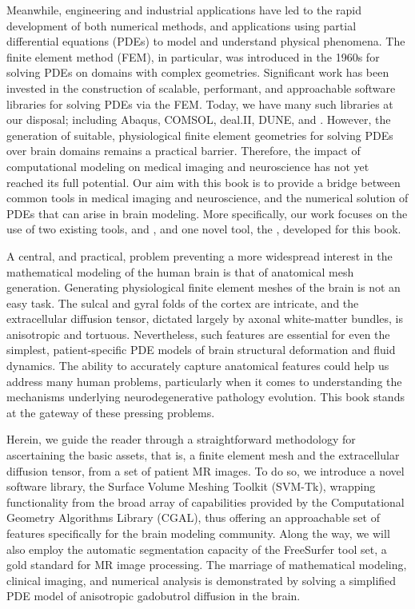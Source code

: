 Meanwhile, engineering and industrial applications have led to the
rapid development of both numerical methods, and applications using
partial differential equations (PDEs) to model and understand physical
phenomena. The finite element method (FEM), in particular, was
introduced in the 1960s for solving PDEs on domains with complex
geometries. Significant work has been invested in the construction of
scalable, performant, and approachable software libraries for solving
PDEs via the FEM. Today, we have many such libraries at our disposal;
including Abaqus, COMSOL, deal.II, DUNE, and {\fenics}. However, the
generation of suitable, physiological finite element geometries for
solving PDEs over brain domains remains a practical
barrier. Therefore, the impact of computational modeling on medical
imaging and neuroscience has not yet reached its full potential. Our
aim with this book is to provide a bridge between common tools in
medical imaging and neuroscience, and the numerical solution of PDEs
that can arise in brain modeling. More specifically, our work focuses
on the use of two existing tools, {\freesurfer} and {\fenics}, and one
novel tool, the {\svmtk}, developed for this book.
 
A central, and practical, problem preventing a more widespread
interest in the mathematical modeling of the human brain is that of
anatomical mesh generation.  Generating physiological finite element
meshes of the brain is not an easy task. The sulcal and gyral folds of
the cortex are intricate, and the extracellular diffusion tensor,
dictated largely by axonal white-matter bundles, is anisotropic and
tortuous. Nevertheless, such features are essential for even the
simplest, patient-specific PDE models of brain structural deformation
and fluid dynamics. The ability to accurately capture anatomical
features could help us address many human problems, particularly when
it comes to understanding the mechanisms underlying neurodegenerative
pathology evolution. This book stands at the gateway of these pressing
problems.

Herein, we guide the reader through a straightforward methodology for
ascertaining the basic assets, that is, a finite element mesh and the
extracellular diffusion tensor, from a set of patient MR images. To do
so, we introduce a novel software library, the Surface Volume Meshing
Toolkit (SVM-Tk), wrapping functionality from the broad array of
capabilities provided by the Computational Geometry Algorithms Library
(CGAL), thus offering an approachable set of features specifically for
the brain modeling community. Along the way, we will also employ the
automatic segmentation capacity of the FreeSurfer tool set, a
gold standard for MR image processing. The marriage of mathematical
modeling, clinical imaging, and numerical analysis is demonstrated by
solving a simplified PDE model of anisotropic gadobutrol diffusion in
the brain.

